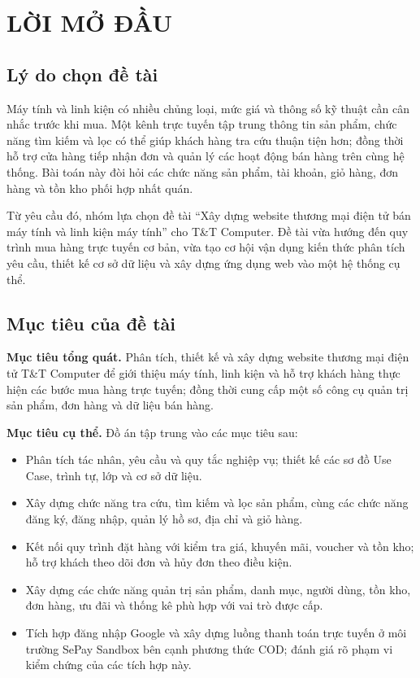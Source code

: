 \chapter*{LỜI MỞ ĐẦU}\label{loimodau_intro}
\vspace{-40pt}

\renewcommand{\thesection}{\arabic{section}} %
\section{Lý do chọn đề tài}
Máy tính và linh kiện có nhiều chủng loại, mức giá và thông số kỹ thuật cần cân nhắc trước khi mua. Một kênh trực tuyến tập trung thông tin sản phẩm, chức năng tìm kiếm và lọc có thể giúp khách hàng tra cứu thuận tiện hơn; đồng thời hỗ trợ cửa hàng tiếp nhận đơn và quản lý các hoạt động bán hàng trên cùng hệ thống. Bài toán này đòi hỏi các chức năng sản phẩm, tài khoản, giỏ hàng, đơn hàng và tồn kho phối hợp nhất quán.

Từ yêu cầu đó, nhóm lựa chọn đề tài ``Xây dựng website thương mại điện tử bán máy tính và linh kiện máy tính'' cho T\&T Computer. Đề tài vừa hướng đến quy trình mua hàng trực tuyến cơ bản, vừa tạo cơ hội vận dụng kiến thức phân tích yêu cầu, thiết kế cơ sở dữ liệu và xây dựng ứng dụng web vào một hệ thống cụ thể.
\section{Mục tiêu của đề tài}
\noindent\textbf{Mục tiêu tổng quát.} Phân tích, thiết kế và xây dựng website thương mại điện tử T\&T Computer để giới thiệu máy tính, linh kiện và hỗ trợ khách hàng thực hiện các bước mua hàng trực tuyến; đồng thời cung cấp một số công cụ quản trị sản phẩm, đơn hàng và dữ liệu bán hàng.

\noindent\textbf{Mục tiêu cụ thể.} Đồ án tập trung vào các mục tiêu sau:
\begin{itemize}
    \item Phân tích tác nhân, yêu cầu và quy tắc nghiệp vụ; thiết kế các sơ đồ Use Case, trình tự, lớp và cơ sở dữ liệu.
    \item Xây dựng chức năng tra cứu, tìm kiếm và lọc sản phẩm, cùng các chức năng đăng ký, đăng nhập, quản lý hồ sơ, địa chỉ và giỏ hàng.
    \item Kết nối quy trình đặt hàng với kiểm tra giá, khuyến mãi, voucher và tồn kho; hỗ trợ khách theo dõi đơn và hủy đơn theo điều kiện.
    \item Xây dựng các chức năng quản trị sản phẩm, danh mục, người dùng, tồn kho, đơn hàng, ưu đãi và thống kê phù hợp với vai trò được cấp.
    \item Tích hợp đăng nhập Google và xây dựng luồng thanh toán trực tuyến ở môi trường SePay Sandbox bên cạnh phương thức COD; đánh giá rõ phạm vi kiểm chứng của các tích hợp này.
\end{itemize}
